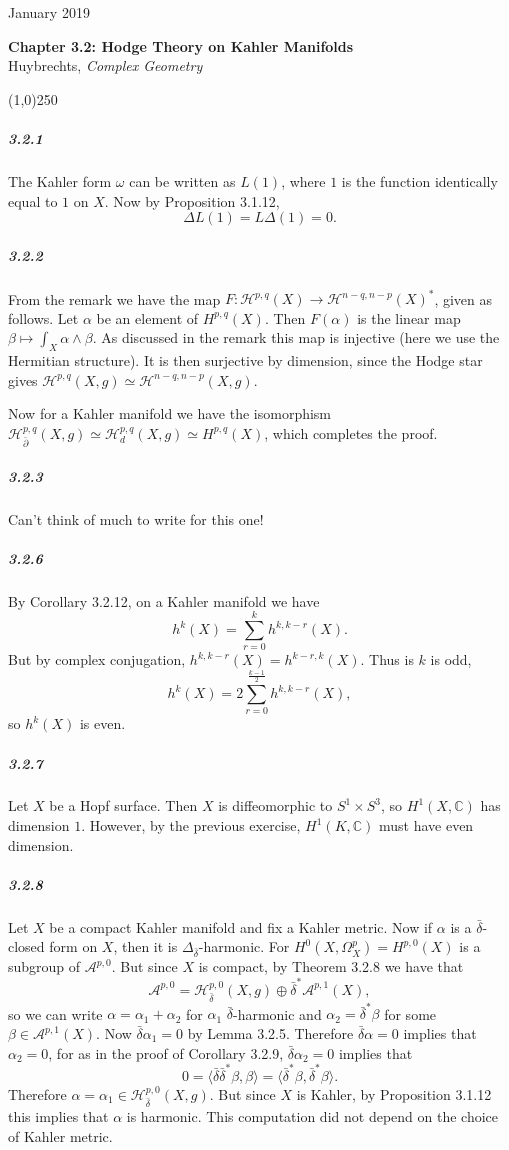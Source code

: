 \documentclass[10pt,letter]{article}
\begin{document}
\noindent 
January 2019
\begin{center}
\textbf{Chapter 3.2: Hodge Theory on Kahler Manifolds}\\ Huybrechts, \textit{Complex Geometry}

\line(1,0){250}
\end{center}

\subparagraph{3.2.1} The Kahler form $\omega$ can be written as $L(1)$, where $1$ is the function identically equal to $1$ on $X$. Now by Proposition 3.1.12,
\[ \Delta L (1) = L \Delta (1) = 0.\] 
\subparagraph{3.2.2} From the remark we have the map $F: \mathcal{H}^{p,q}(X) \rightarrow \mathcal{H}^{n-q,n-p}(X)^{\ast}$, given as follows. Let $\alpha$ be an element of $H^{p,q}(X)$. Then $F(\alpha)$ is the linear map $\beta \mapsto \int_X \alpha \wedge \beta$. As discussed in the remark this map is injective (here we use the Hermitian structure). It is then surjective by dimension, since the Hodge star gives $\mathcal{H}^{p,q}(X,g) \simeq \mathcal{H}^{n-q,n-p}(X,g)$. 

Now for a Kahler manifold we have the isomorphism $\mathcal{H}^{p,q}_{\bar{\partial}}(X,g) \simeq \mathcal{H}^{p,q}_{d}(X,g) \simeq H^{p,q}(X)$, which completes the proof.

\subparagraph{3.2.3} Can't think of much to write for this one!

\subparagraph{3.2.6} By Corollary 3.2.12, on a Kahler manifold we have
\[ h^k(X) = \sum_{r = 0}^k h^{k,k-r}(X).\]
But by complex conjugation, $h^{k,k-r}(X) = h^{k-r,k}(X)$. Thus is $k$ is odd,
\[ h^k(X) = 2\sum_{r = 0}^{\frac{k-1}{2}} h^{k,k-r}(X), \]
so $h^k(X)$ is even. 
  
\subparagraph{3.2.7} Let $X$ be a Hopf surface. Then $X$ is diffeomorphic to $S^1 \times S^3$, so $H^1(X,\mathbb{C})$ has dimension $1$. However, by the previous exercise, $H^1(K,\mathbb{C})$ must have even dimension. 

\subparagraph{3.2.8} Let $X$ be a compact Kahler manifold and fix a Kahler metric. Now if $\alpha$ is a $\bar{\delta}$-closed form on $X$, then it is $\Delta_{\bar{\delta}}$-harmonic. For $H^0(X,\Omega^p_X) = H^{p,0}(X)$ is a subgroup of $\mathcal{A}^{p,0}$. But since $X$ is compact, by Theorem 3.2.8 we have that \[ \mathcal{A}^{p,0} = \mathcal{H}^{p,0}_{\bar{\delta}}(X,g) \oplus \bar{\delta}^{\ast} \mathcal{A}^{p,1}(X), \]
so we can write $\alpha = \alpha_1 + \alpha_2$ for $\alpha_1$ $\bar{\delta}$-harmonic and $\alpha_2 = \bar{\delta}^{\ast}\beta$ for some $\beta \in \mathcal{A}^{p,1}(X)$. Now $\bar{\delta}\alpha_1 = 0$ by Lemma 3.2.5. Therefore $\bar{\delta}\alpha = 0$ implies that $\alpha_2 = 0$, for as in the proof of Corollary 3.2.9, $\bar{\delta}\alpha_2 = 0$ implies that
\[ 0 = \langle \bar{\delta}\bar{\delta}^{\ast} \beta,\beta \rangle = \langle \bar{\delta}^{\ast}\beta, \bar{\delta}^{\ast}\beta \rangle.\] 
Therefore $\alpha = \alpha_1 \in \mathcal{H}^{p,0}_{\bar{\delta}}(X,g)$. But since $X$ is Kahler, by Proposition 3.1.12 this implies that $\alpha$ is harmonic. This computation did not depend on the choice of Kahler metric. 
\end{document}
